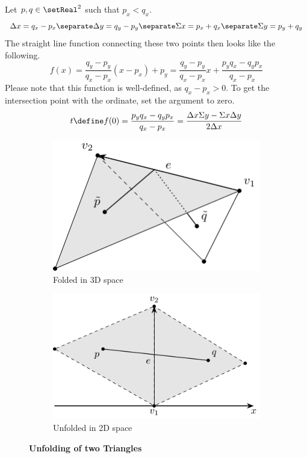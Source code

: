 \documentclass{stdlocal}
\begin{document}
Let $p,q\in\setReal^2$ such that $p_x < q_x$.
\[
  \Delta x = q_x - p_x
  \separate
  \Delta y = q_y - p_y
  \separate
  \Sigma x = p_x + q_x
  \separate
  \Sigma y = p_y + q_y
\]
The straight line function connecting these two points then looks like the following.
\[
  f(x) = \frac{q_y - p_y}{q_x - p_x}(x - p_x) + p_y = \frac{q_y - p_y}{q_x - p_x}x + \frac{p_yq_x - q_yp_x}{q_x - p_x}
\]
Please note that this function is well-defined, as $q_x - p_x > 0$.
To get the intersection point with the ordinate, set the argument to zero.
\[
  t\define f(0) = \frac{p_yq_x - q_yp_x}{q_x - p_x} = \frac{\Delta x \Sigma y - \Sigma x \Delta y}{2 \Delta x}
\]
\begin{figure}[h]
  \begin{subfigure}[b]{0.49\linewidth}
    \centering
    \includegraphics[width=0.9\linewidth]{figures/unfolding_geodesic.pdf}
    \caption{Folded in 3D space}
  \end{subfigure}
  \hfill
  \begin{subfigure}[b]{0.49\linewidth}
    \centering
    \includegraphics[width=\linewidth]{figures/unfolding_unfolded.pdf}
    \caption{Unfolded in 2D space}
  \end{subfigure}
  \caption[Unfolding of two Triangles]{%
    \textbf{Unfolding of two Triangles}
  }
  \label{fig:design-triangle-unfolding}
\end{figure}
\end{document}
